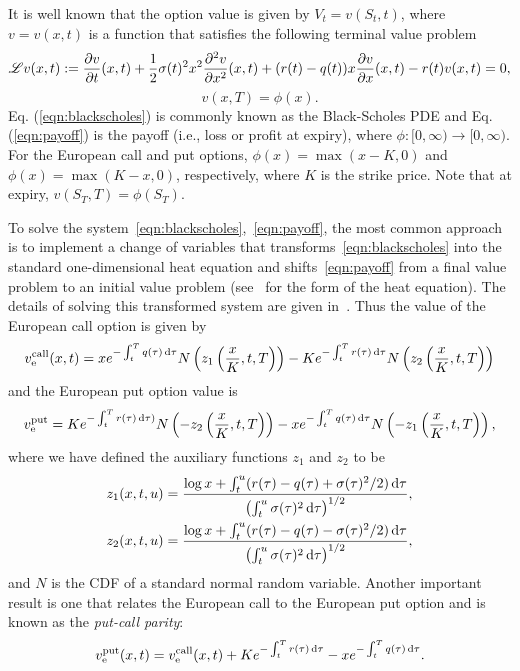 It is well known that the option value is given by $V_t = v(S_t,t)$, where $v = v(x,t)$ is a function that satisfies the following terminal value problem
	\begin{equation}
		\label{eqn:blackscholes}
		\mathscr L v(x,t) := \frac{\partial v}{\partial t}(x,t) + \frac{1}{2}\sigma(t)^2x^2\frac{\partial^2 v}{\partial x^2}(x,t) + (r(t)-q(t))x\frac{\partial v}{\partial x}(x,t) - r(t)v(x,t) = 0,
	\end{equation}
	\begin{equation}
		\label{eqn:payoff}
		v(x,T) = \phi(x).
	\end{equation}
Eq. (\ref{eqn:blackscholes}) is commonly known as the Black-Scholes PDE and Eq. (\ref{eqn:payoff}) is the payoff (i.e., loss or profit at expiry), where $\phi : [0,\infty) \rightarrow [0, \infty)$. For the European call and put options, $\phi(x) = \max(x-K,0)$ and $\phi(x) = \max(K-x,0)$, respectively, where $K$ is the strike price. Note that at expiry, $v(S_T,T) = \phi(S_T)$.

To solve the system~\eqref{eqn:blackscholes},~\eqref{eqn:payoff}, the most common approach is to implement a change of variables that transforms~\eqref{eqn:blackscholes} into the standard one-dimensional heat equation and shifts~\eqref{eqn:payoff} from a final value problem to an initial value problem (see~\cite{cannon1984one} for the form of the heat equation).
The details of solving this transformed system are given in~\cite{Wilmott1995}. Thus the value of the European call option is given by
	\begin{equation}
		\label{eqn:EUcall}
			v_{\text{e}}^{\text{call}}(x,t) = xe^{-\int_t^T q(\tau) \, \mathrm d\tau} N\left(z_1\left( \frac{x}{K}, t, T \right)\right) - K e^{-\int_t^T r(\tau) \, \mathrm d\tau} N\left(z_2\left( \frac{x}{K}, t, T \right)\right)
		\end{equation}
and the European put option value is
	\begin{equation}
		\label{eqn:EUput}
		v_{\text{e}}^{\text{put}} = K e^{-\int_t^T r(\tau) \, \mathrm d\tau) } N\left(-z_2\left( \frac{x}{K}, t, T \right)\right) - xe^{-\int_t^T q(\tau) \, \mathrm d\tau} N\left(-z_1\left( \frac{x}{K}, t, T \right)\right),
	\end{equation}
where we have defined the auxiliary functions $z_1$ and $z_2$ to be
	\begin{align}
		z_1(x,t,u) & = \frac{\log x + \int_t^u (r(\tau) - q(\tau) + \sigma(\tau)^2/2) \, \mathrm d\tau}{\left(\int_t^u \sigma(\tau)^2 \, \mathrm d\tau\right)^{1/2}}, \label{eqn:z1}\\
		z_2(x,t,u) & = \frac{\log x + \int_t^u (r(\tau) - q(\tau) - \sigma(\tau)^2/2) \, \mathrm d\tau}{\left(\int_t^u \sigma(\tau)^2 \, \mathrm d\tau\right)^{1/2}} \label{eqn:z2},
	\end{align}
and $N$ is the CDF of a standard normal random variable. Another important result is one that relates the European call to the European put option and is known as the \emph{put-call parity}:
	\begin{equation}
		\label{eqn:pcp}
		v_\text{e}^{\text{put}}(x,t) = v_\text{e}^{\text{call}}(x,t) + Ke^{-\int_t^T r(\tau) \, \mathrm d\tau} - xe^{-\int_t^T q(\tau) \, \mathrm d\tau}.
	\end{equation}

